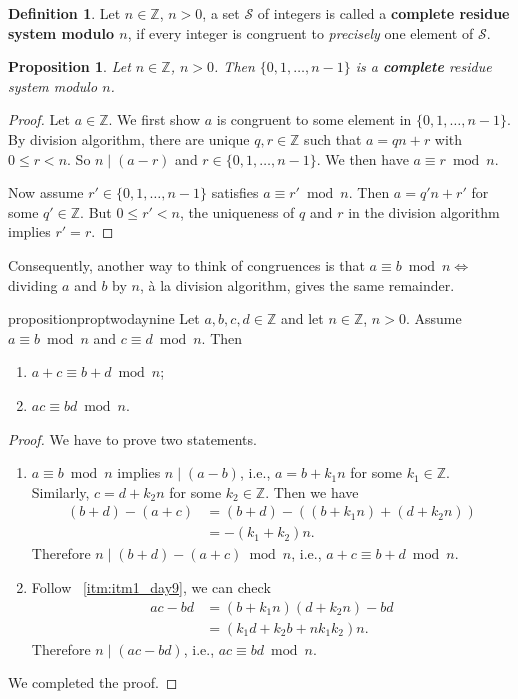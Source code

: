 \documentclass{amsbook}
\theoremstyle{plain}
\newtheorem{proposition}[theorem]{Proposition}
\theoremstyle{definition}
\newtheorem{definition}[theorem]{Definition}
\theoremstyle{remark}
\numberwithin{equation}{chapter}
\numberwithin{figure}{chapter}
\newcommand{\Z}{\mathbb{Z}}
\begin{document}
\begin{definition}
  Let $n \in \Z$, $n > 0$, a set $\mathcal{S}$ of integers is called a \textbf{complete residue system modulo $n$}, if every integer is congruent to \emph{precisely} one element of $\mathcal{S}$.
\end{definition}
\begin{proposition}\label{prop:res_sys}
  Let $n \in \Z$, $n > 0$. Then $\{0, 1, \ldots, n - 1\}$ is a \textbf{complete} residue system modulo $n$.
\end{proposition}
\begin{proof}
  Let $a \in \Z$. We first show $a$ is congruent to some element in $\{ 0, 1, \ldots, n -1 \}$. By division algorithm, there are unique $q, r \in \Z$ such that $a = q n + r$ with $0 \leqslant r < n$. So $n \mid (a - r)$ and $r \in \{0, 1, \ldots, n-1\}$. We then have $a \equiv r \bmod n$.

  Now assume $r' \in \{ 0, 1, \ldots, n-1 \}$ satisfies $a \equiv r' \bmod n$. Then $a = q'n + r'$ for some $q' \in \Z$. But $0 \leqslant r' < n$, the uniqueness of $q$ and $r$ in the division algorithm implies $r' = r$.
\end{proof}
Consequently, another way to think of congruences is that $a \equiv b \bmod n \iff $ dividing $a$ and $b$ by $n$, \`a la division algorithm, gives the same remainder.

\begin{restatable}{proposition}{proptwodaynine}\label{prop:prop2_day9}
  Let $a, b, c, d \in \Z$ and let $n \in \Z$, $n > 0$. Assume $a \equiv b \bmod n$ and $c \equiv d \bmod n$. Then
  \begin{enumerate}[label=(\arabic*)]
  \item $a + c \equiv b + d \bmod n$;
  \item $ac \equiv bd \bmod n$.
  \end{enumerate}
\end{restatable}
\begin{proof} We have to prove two statements.
  \begin{enumerate}[label=(\roman*)]
  \item $a \equiv b \bmod n$ implies $n \mid (a - b)$, i.e., $a = b + k_1 n$ for some $k_1 \in \Z$. Similarly, $c = d + k_2 n$ for some $k_2 \in \Z$.    
    Then we have
    \begin{align}
      (b + d) - (a + c) &= (b + d) - ((b + k_1 n) + (d + k_2 n)) \\
                        &= -(k_1 + k_2) n.
    \end{align}
    Therefore $n \mid (b+d) - (a+c) \bmod n$, i.e., $a + c \equiv b + d \bmod n$. \label{itm:itm1_day9} 
  \item Follow ~\ref{itm:itm1_day9}, we can check
    \begin{align}
      ac - bd &= (b + k_1 n) (d + k_2 n) - bd \\
              &= (k_1d + k_2b + nk_1k_2)n.
    \end{align}
    Therefore $n \mid (ac - bd)$, i.e., $ac \equiv bd \bmod n$.
  \end{enumerate}

  We completed the proof.
\end{proof}
\end{document}
